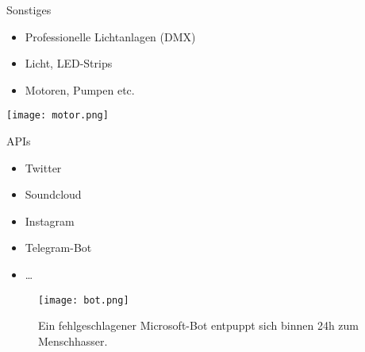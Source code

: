 \begin{frame}{Sonstiges}
\begin{itemize}
	\item Professionelle Lichtanlagen (DMX)
	\item Licht, LED-Strips
	\item Motoren, Pumpen etc.
\end{itemize}

\begin{center}
\texttt{[image: motor.png]}
\end{center}
\end{frame}


\begin{frame}{APIs}
\begin{itemize}
	\item Twitter
	\item Soundcloud
	\item Instagram
	\item Telegram-Bot
	\item \dots{}
\end{itemize}

\begin{center}
\begin{figure}
\texttt{[image: bot.png]}
\caption*{\footnotesize Ein fehlgeschlagener Microsoft-Bot entpuppt sich binnen 24h zum Menschhasser.}
\end{figure}
\end{center}

\end{frame}
